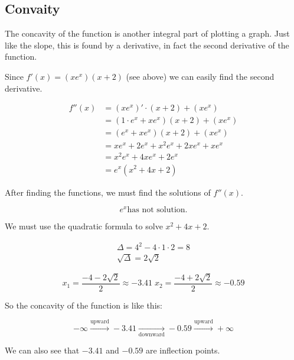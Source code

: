 \subsection{Convaity}

The concavity of the function is another integral part of plotting a graph.
Just like the slope, this is found by a derivative, in fact the second
derivative of the function.

Since \(f'(x) = (xe^x)(x+2)\) (see above) we can easily find the second derivative.

\[
    \begin{aligned}
        f''(x) & = (xe^x)'\cdot(x+2) + (xe^x) \\
        & = (1\cdot e^x + xe^x)(x+2) + (xe^x) \\
        & = (e^x + xe^x)(x+2) + (xe^x) \\
        & = xe^x + 2e^x + x^2 e^x + 2xe^x + xe^x \\
        & = x^2e^x + 4xe^x + 2e^x \\
        & = e^x(x^2 + 4x + 2)
    \end{aligned}
\]

After finding the functions, we must find the solutions of \(f''(x)\).

\[
    e^x \text{has not solution.}
\]

We must use the quadratic formula to solve \(x^2 + 4x + 2\).

\[
    \begin{split}
        \Delta = 4^2 - 4 \cdot 1 \cdot 2 = 8 \\
        \sqrt{\Delta} = 2\sqrt{2}
    \end{split}
\]

\[
    x_1 = \frac{-4-2\sqrt{2}}{2} \approx -3.41 \; x_2 = \frac{-4+2\sqrt{2}}{2} \approx -0.59
\]

So the concavity of the function is like this:

\[
    -\infty \xrightarrow{\text{upward}} -3.41 \xrightarrow[\text{downward}]{} -0.59 \xrightarrow{\text{upward}} + \infty
\]

We can also see that \(-3.41\) and \(-0.59\) are inflection points.